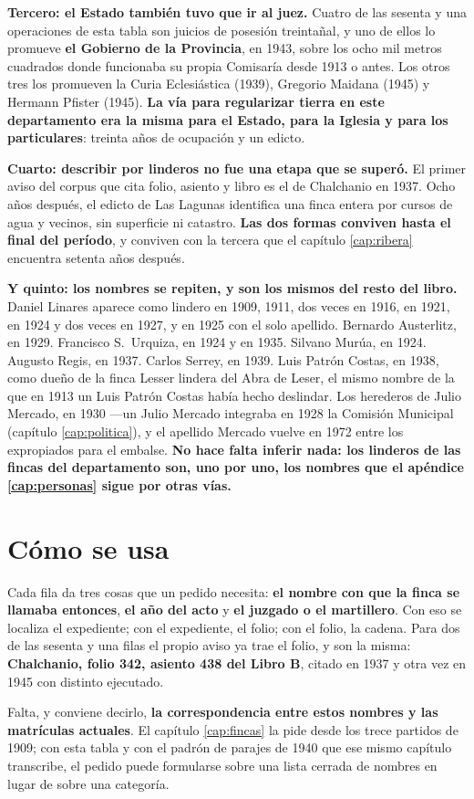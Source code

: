 \textbf{Tercero: el Estado también tuvo que ir al juez.} Cuatro de las sesenta y una operaciones de esta tabla son
juicios de posesión treintañal, y uno de ellos lo promueve \textbf{el Gobierno de la
Provincia}, en 1943, sobre los ocho mil metros cuadrados donde funcionaba su propia Comisaría
desde 1913 o antes. Los otros tres los promueven la Curia Eclesiástica (1939), Gregorio
Maidana (1945) y Hermann Pfister (1945). \textbf{La vía para regularizar tierra en este
departamento era la misma para el Estado, para la Iglesia y para los particulares}: treinta años
de ocupación y un edicto.

\textbf{Cuarto: describir por linderos no fue una etapa que se superó.} El primer aviso del
corpus que cita folio, asiento y libro es el de Chalchanio en 1937. Ocho años después, el
edicto de Las Lagunas identifica una finca entera por cursos de agua y vecinos, sin superficie
ni catastro. \textbf{Las dos formas conviven hasta el final del período}, y conviven con la
tercera que el capítulo \ref{cap:ribera} encuentra setenta años después.

\textbf{Y quinto: los nombres se repiten, y son los mismos del resto del libro.} Daniel
Linares aparece como lindero en 1909, 1911, dos veces en 1916, en 1921, en 1924 y dos veces en 1927, y en 1925 con el solo apellido. Bernardo
Austerlitz, en 1929. Francisco S.\
Urquiza, en 1924 y en 1935. Silvano Murúa, en 1924. Augusto Regis, en 1937.
Carlos Serrey\index{Serrey, Carlos}, en 1939. Luis Patrón Costas, en 1938, como dueño de la finca Lesser lindera del Abra de Leser, el mismo nombre de la que en 1913 un Luis Patrón Costas había hecho deslindar. Los herederos de
Julio Mercado, en 1930 ---un Julio Mercado integraba en 1928 la Comisión Municipal (capítulo \ref{cap:politica}), y el apellido Mercado vuelve en 1972 entre los expropiados para el
embalse. \textbf{No hace falta inferir nada: los linderos de las fincas del departamento son,
uno por uno, los nombres que el apéndice \ref{cap:personas} sigue por otras vías.}

\section*{Cómo se usa}

Cada fila da tres cosas que un pedido necesita: \textbf{el nombre con que la finca se llamaba
entonces}, \textbf{el año del acto} y \textbf{el juzgado o el martillero}. Con eso se localiza
el expediente; con el expediente, el folio; con el folio, la cadena. Para dos de las
sesenta y una filas el propio aviso ya trae el folio, y son la misma: \textbf{Chalchanio, folio
342, asiento 438 del Libro B}, citado en 1937 y otra vez en 1945 con distinto ejecutado.

Falta, y conviene decirlo, \textbf{la correspondencia entre estos nombres y las matrículas
actuales}. El capítulo \ref{cap:fincas} la pide desde los trece partidos de 1909; con esta tabla
y con el padrón de parajes de 1940 que ese mismo capítulo transcribe, el pedido puede formularse
sobre una lista cerrada de nombres en lugar de sobre una categoría.
